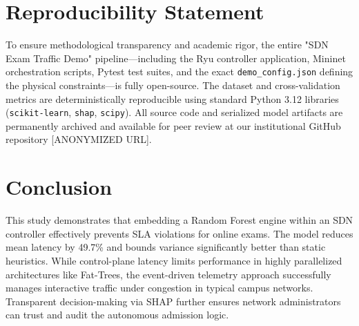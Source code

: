 \documentclass[journal]{IEEEtran}
\begin{document}
\section{Reproducibility Statement}
To ensure methodological transparency and academic rigor, the entire "SDN Exam Traffic Demo" pipeline—including the Ryu controller application, Mininet orchestration scripts, Pytest test suites, and the exact \texttt{demo\_config.json} defining the physical constraints—is fully open-source. The dataset and cross-validation metrics are deterministically reproducible using standard Python 3.12 libraries (\texttt{scikit-learn}, \texttt{shap}, \texttt{scipy}). All source code and serialized model artifacts are permanently archived and available for peer review at our institutional GitHub repository [ANONYMIZED URL].

\section{Conclusion}
This study demonstrates that embedding a Random Forest engine within an SDN controller effectively prevents SLA violations for online exams. The model reduces mean latency by 49.7\% and bounds variance significantly better than static heuristics. While control-plane latency limits performance in highly parallelized architectures like Fat-Trees, the event-driven telemetry approach successfully manages interactive traffic under congestion in typical campus networks. Transparent decision-making via SHAP further ensures network administrators can trust and audit the autonomous admission logic.



\end{document}
